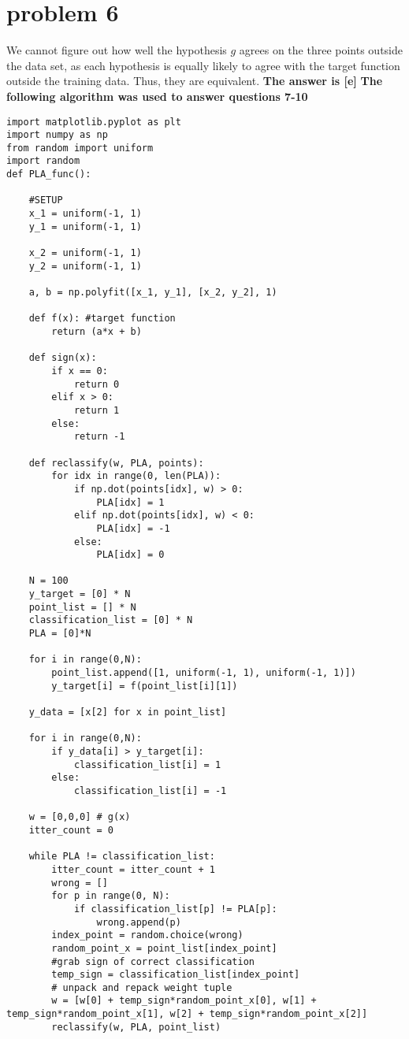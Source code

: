 \documentclass{article}
\begin{document}
\section*{problem 6}
We cannot figure out how well the hypothesis $g$ agrees on the three points outside the data set, as each hypothesis is equally likely to agree with the target function outside the training data. Thus, they are equivalent.
\newline \newline
\textbf{The answer is [e]}
\newline\newline
\textbf{\Large The following algorithm was used to answer questions 7-10}
\newline
\begin{verbatim}
import matplotlib.pyplot as plt
import numpy as np
from random import uniform
import random
def PLA_func():
    
    #SETUP
    x_1 = uniform(-1, 1)
    y_1 = uniform(-1, 1)

    x_2 = uniform(-1, 1)
    y_2 = uniform(-1, 1)
    
    a, b = np.polyfit([x_1, y_1], [x_2, y_2], 1)
    
    def f(x): #target function
        return (a*x + b)

    def sign(x):
        if x == 0:
            return 0
        elif x > 0:
            return 1
        else:
            return -1
        
    def reclassify(w, PLA, points):
        for idx in range(0, len(PLA)):
            if np.dot(points[idx], w) > 0:
                PLA[idx] = 1
            elif np.dot(points[idx], w) < 0:
                PLA[idx] = -1
            else:
                PLA[idx] = 0
            
    N = 100
    y_target = [0] * N
    point_list = [] * N
    classification_list = [0] * N
    PLA = [0]*N

    for i in range(0,N):
        point_list.append([1, uniform(-1, 1), uniform(-1, 1)])
        y_target[i] = f(point_list[i][1])
                                
    y_data = [x[2] for x in point_list] 

    for i in range(0,N):
        if y_data[i] > y_target[i]:
            classification_list[i] = 1
        else:
            classification_list[i] = -1
            
    w = [0,0,0] # g(x) 
    itter_count = 0

    while PLA != classification_list:
        itter_count = itter_count + 1
        wrong = []
        for p in range(0, N):
            if classification_list[p] != PLA[p]:
                wrong.append(p)
        index_point = random.choice(wrong)
        random_point_x = point_list[index_point]        
        #grab sign of correct classification
        temp_sign = classification_list[index_point]
        # unpack and repack weight tuple
        w = [w[0] + temp_sign*random_point_x[0], w[1] + temp_sign*random_point_x[1], w[2] + temp_sign*random_point_x[2]]
        reclassify(w, PLA, point_list)


\end{verbatim}
\end{document}
